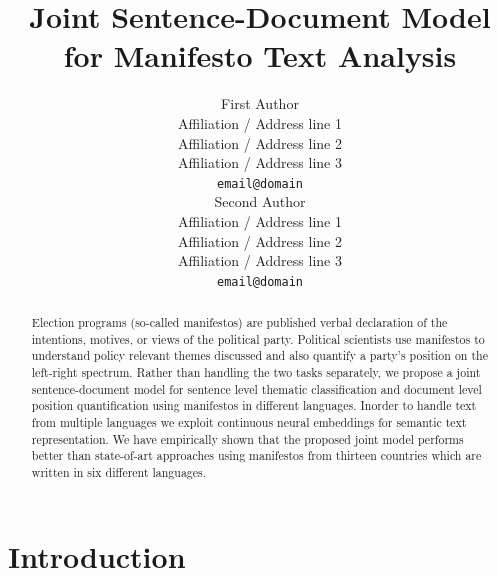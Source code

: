 \documentclass[11pt,a4paper]{article}
\title{Joint Sentence-Document Model for Manifesto Text Analysis}
\author{First Author \\
  Affiliation / Address line 1 \\
  Affiliation / Address line 2 \\
  Affiliation / Address line 3 \\
  {\tt email@domain} \\\And
  Second Author \\
  Affiliation / Address line 1 \\
  Affiliation / Address line 2 \\
  Affiliation / Address line 3 \\
  {\tt email@domain} \\}
\date{}
\begin{document}
\maketitle
\begin{abstract}
Election programs (so-called manifestos) are published verbal declaration of the intentions, motives, or views of the political party. Political scientists use manifestos to understand policy relevant themes discussed and also quantify a party's position on the left-right spectrum. Rather than handling the two tasks separately, we propose a joint sentence-document model for sentence level thematic classification and document level position quantification using manifestos in different languages. Inorder to handle text from multiple languages we exploit continuous neural embeddings for semantic text representation. We have empirically shown that the proposed joint model performs better than state-of-art approaches using manifestos from thirteen countries which are written in six different languages.
\end{abstract}

\section{Introduction}

\end{document}
